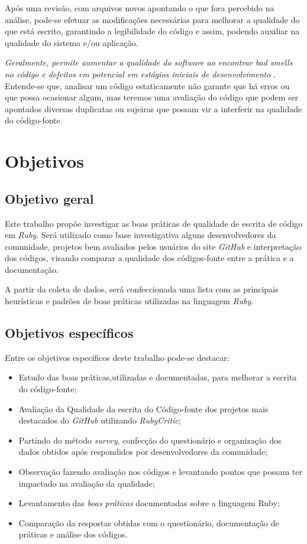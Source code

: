 \documentclass[11pt,a4paper]{article}
\begin{document}
Após uma revisão, com arquivos novos apontando o que fora percebido na análise, pode-se efetuar as modificações necessárias para melhorar a qualidade do que está escrito, garantindo a legibilidade do código e assim, podendo auxiliar na qualidade do sistema e/ou aplicação. 

\textit{Geralmente, permite aumentar a qualidade do software ao encontrar bad smells no código e defeitos em potencial em estágios iniciais de desenvolvimento }\cite{Opportunities}. Entende-se que, analisar um código estaticamente não garante que há erros ou que possa ocasionar algum, mas teremos uma avaliação do código que podem ser apontados diversas duplicatas ou sujeiras que possam vir a interferir na qualidade do código-fonte.

\section{Objetivos}\label{sec:objetivos}

\subsection{Objetivo geral}

Este trabalho propõe investigar as boas práticas de qualidade de escrita de código em \textit{Ruby}. Será utilizado como base investigativa alguns desenvolvedores da comunidade, projetos bem avaliados pelos usuários do site \textit{GitHub} e interpretação dos códigos, visando comparar a qualidade dos códigos-fonte entre a prática e a documentação. 

A partir da coleta de dados, será confeccionada uma lista com as principais heurísticas e padrões de boas práticas utilizadas na linguagem \textit{Ruby}.

\subsection{Objetivos específicos}

Entre os objetivos específicos deste trabalho pode-se destacar:

\begin{itemize}
  \item Estudo das boas práticas,utilizadas e documentadas, para melhorar a escrita do código-fonte;
  \item Avaliação da Qualidade da escrita do Código-fonte dos projetos mais destacados do \textit{GitHub} utilizando \textit{RubyCritic};
  \item Partindo do método \textit{survey}, confecção do questionário e organização dos dados obtidos após respondidos por desenvolvedores da comunidade;
  \item Observação fazendo avaliação nos códigos e levantando pontos que possam ter impactado na avaliação da qualidade;
  \item Levantamento das \textit{boas práticas} documentadas sobre a linguagem Ruby;
  \item Comparação da respostas obtidas com o questionário, documentação de práticas e análise dos códigos.
\end{itemize}
\end{document}
